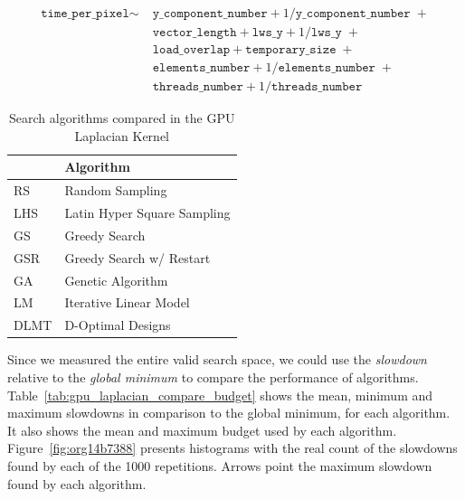 \documentclass[conference]{IEEEtran}
\begin{document}
\vspace{-7pt}

{\scriptsize
\begin{align}
\label{eq:gpu_laplacian_performance_model}
\texttt{time\_per\_pixel} \sim & \; \texttt{y\_component\_number} + 1 / \texttt{y\_component\_number} \; + \nonumber \\
& \; \texttt{vector\_length} + \texttt{lws\_y} + 1 / \texttt{lws\_y} \; + \nonumber \\
& \; \texttt{load\_overlap} + \texttt{temporary\_size} \; + \\
& \; \texttt{elements\_number} + 1 / \texttt{elements\_number} \; + \nonumber \\
& \; \texttt{threads\_number} + 1 /\texttt{threads\_number} \nonumber
\end{align}
}

\vspace{-18pt}

\begin{table}[ht]
\caption{\label{tab:orgae86906}
Search algorithms compared in the GPU Laplacian Kernel}
\centering
\footnotesize
\begin{tabular}{ll}
\toprule
 & Algorithm\\
\midrule
RS & Random Sampling\\
LHS & Latin Hyper Square Sampling\\
GS & Greedy Search\\
GSR & Greedy Search w/ Restart\\
GA & Genetic Algorithm\\
LM & Iterative Linear Model\\
DLMT & D-Optimal Designs\\
\bottomrule
\end{tabular}
\end{table}

Since we measured the entire valid search space, we could use the \emph{slowdown}
relative to the \emph{global minimum} to compare the performance of algorithms.
Table~\ref{tab:gpu_laplacian_compare_budget} shows the mean, minimum and
maximum slowdowns in comparison to the global minimum, for each algorithm. It
also shows the mean and maximum budget used by each algorithm.
Figure~\ref{fig:org14b7388} presents histograms with the
real count of the slowdowns found by each of the 1000 repetitions. Arrows point
the maximum slowdown found by each algorithm.
\end{document}
